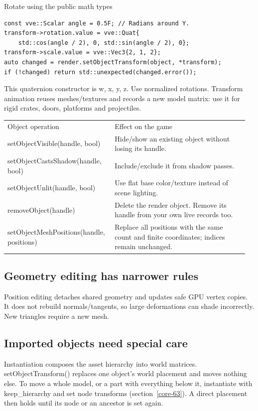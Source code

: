 \documentclass[11pt,a4paper]{article}
\begin{document}
Rotate using the public math types

\begin{lstlisting}[language={}]
const vve::Scalar angle = 0.5F; // Radians around Y.
transform->rotation.value = vve::Quat{
    std::cos(angle / 2), 0, std::sin(angle / 2), 0};
transform->scale.value = vve::Vec3{2, 1, 2};
auto changed = render.setObjectTransform(object, *transform);
if (!changed) return std::unexpected(changed.error());
\end{lstlisting}

This quaternion constructor is w, x, y, z. Use normalized rotations. Transform animation reuses meshes/textures and records a new model matrix: use it for rigid crates, doors, platforms and projectiles.

{\small
\begin{longtable}{@{}p{0.42\linewidth}p{0.54\linewidth}@{}}
Object operation & Effect on the game \\
setObjectVisible(handle, bool) & Hide/show an existing object without losing its handle. \\
setObjectCastsShadow(handle, bool) & Include/exclude it from shadow passes. \\
setObjectUnlit(handle, bool) & Use flat base color/texture instead of scene lighting. \\
removeObject(handle) & Delete the render object. Remove its handle from your own live records too. \\
setObjectMeshPositions(handle, positions) & Replace all positions with the same count and finite coordinates; indices remain unchanged. \\
\end{longtable}
}

\subsection*{Geometry editing has narrower rules}
Position editing detaches shared geometry and updates safe GPU vertex copies. It does not rebuild normals/tangents, so large deformations can shade incorrectly. New triangles require a new mesh.

\subsection*{Imported objects need special care}
Instantiation composes the asset hierarchy into world matrices. setObjectTransform() replaces one object's world placement and moves nothing else. To move a whole model, or a part with everything below it, instantiate with keep\_hierarchy and set node transforms (section~\ref{core-63}). A direct placement then holds until its node or an ancestor is set again.
\end{document}
